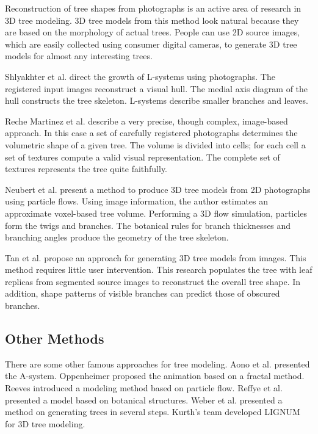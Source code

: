 Reconstruction of tree shapes from photographs is an active area of research in 3D tree modeling. 3D tree models from this method look natural because they are based on the morphology of actual trees. People can use 2D source images, which are easily collected using consumer digital cameras, to generate 3D tree models for almost any interesting trees. 

Shlyakhter et al. \cite{shlyakhter:ieeecga01} direct the growth of L-systems using photographs. The registered input images reconstruct a visual hull. The medial axis diagram of the hull constructs the tree skeleton. L-systems describe smaller branches and leaves. 

Reche Martinez et al. \cite{RecheMartinez2004} describe a very precise, though complex, image-based approach. In this case a set of carefully registered photographs determines the volumetric shape of a given tree. The volume is divided into cells; for each cell a set of textures compute a valid visual representation. The complete set of textures represents the tree quite faithfully. 

Neubert et al. \cite{neubert:acmtg07} present a method to produce 3D tree models from 2D photographs using particle flows. Using image information, the author estimates an approximate voxel-based tree volume. Performing a 3D flow simulation, particles form the twigs and branches. The botanical rules for branch thicknesses and branching angles produce the geometry of the tree skeleton. 

Tan et al. \cite{Tan:2007:ITM} propose an approach for generating 3D tree models from images. This method requires little user intervention. This research populates the tree with leaf replicas from segmented source images to reconstruct the overall tree shape. In addition, shape patterns of visible branches can predict those of obscured branches.

\subsection{Other Methods}

There are some other famous approaches for tree modeling.  Aono et al. \cite{Aono:1984} presented the A-system. Oppenheimer \cite{Oppenheimer1986} proposed the animation based on a fractal method. Reeves \cite{ReevesB85} introduced a modeling method based on particle flow. Reffye et al. \cite{deReffye1988,YAN03} presented a model based on botanical structures. Weber et al. \cite{Weber1998} presented a method on generating trees in several steps. Kurth's team \cite{kurth:sf97} developed LIGNUM \cite{Perttunen98} for 3D tree modeling. 

